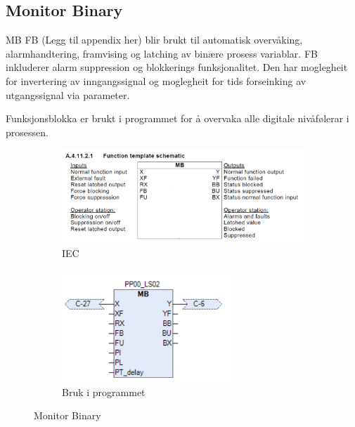 \subsection{Monitor Binary}
\gls{MB} \gls{FB} (Legg til appendix her) blir brukt til automatisk overvåking, alarmhandtering, framvising og latching av binære prosess variablar.
\gls{FB} inkluderer alarm suppression og blokkerings funksjonalitet. Den har moglegheit for invertering av 
inngangssignal og moglegheit for tids forseinking av utgangssignal via parameter.

Funksjonsblokka er brukt i programmet for å overvaka alle digitale nivåfølerar i prosessen.


\begin{figure}[htbp]
    \centering
    \begin{subfigure}[b]{0.45\textwidth}
        \centering
        \includegraphics[width=1\textwidth]{Bilder/MBBlokkIEC.png}
        \caption{IEC}\label{fig:Monitor Binary blokk IEC}
    \end{subfigure}
    \hfill
    \begin{subfigure}[b]{0.45\textwidth}
        \centering
        \includegraphics[width=0.7\textwidth]{Bilder/MBBlokkIProgrammet.png}
        \caption{Bruk i programmet}\label{fig:Monitor Binary blokk i programmet}
    \end{subfigure}
    \caption{Monitor Binary}\label{fig:Monitor Binary}
\end{figure}

